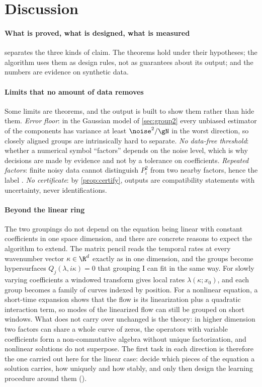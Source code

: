 \section{Discussion}\label{sec:discussion}
\paragraph{What is proved, what is designed, what is measured}  separates the three kinds of claim. The
theorems hold under their hypotheses; the algorithm uses them as design rules, not as guarantees about its output; and
the numbers are evidence on synthetic data.

\paragraph{Limits that no amount of data removes} Some limits are theorems, and the output is built to show them rather
than hide them. \emph{Error floor}: in the Gaussian model of \cref{sec:group2} every unbiased estimator of the components
has variance at least $\noise^2/\gN$ in the worst direction, so closely aligned groups are intrinsically hard to separate.
\emph{No data-free threshold}: whether a numerical symbol ``factors'' depends on the noise level, which is why decisions are
made by evidence and not by a tolerance on coefficients. \emph{Repeated factors}: finite noisy data cannot distinguish
$P_i^2$ from two nearby factors, hence the label \UND. \emph{No certificate}: by \cref{prop:certify}, outputs are
compatibility statements with uncertainty, never identifications.

\paragraph{Beyond the linear ring} The two groupings do not depend on the equation being linear with constant
coefficients in one space dimension, and there are concrete reasons to expect the algorithm to extend. The matrix pencil
reads the temporal rates at every wavenumber vector $\kappa\in\R^d$ exactly as in one dimension, and the groups become
hypersurfaces $Q_j(\lambda,i\kappa)=0$ that grouping I can fit in the same way. For slowly varying coefficients a windowed
transform gives local rates $\lambda(\kappa;x_0)$, and each group becomes a family of curves indexed by position. For a
nonlinear equation, a short-time expansion shows that the flow is its linearization plus a quadratic interaction term,
so modes of the linearized flow can still be grouped on short windows. What does not carry over unchanged is the
theory: in higher dimension two factors can share a whole curve of zeros, the operators with variable coefficients form a
non-commutative algebra without unique factorization, and nonlinear solutions do not superpose. The first task in each
direction is therefore the one carried out here for the linear case: decide which pieces of the equation a solution
carries, how uniquely and how stably, and only then design the learning procedure around them (\SMbeyond).

